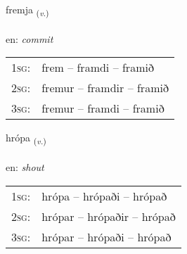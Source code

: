 \documentclass[frontgrid, backgrid]{flacards}\usepackage[]{graphicx}\usepackage[]{xcolor}
\begin{document}
\renewcommand{\flhead}{\vskip5pt \fboxsep=0pt {\small\bfseries\footnotesize Sagnorð | Verb}}
\renewcommand{\fcfoot}{\vskip5pt \fboxsep=0pt \hspace{2pt}{\small\bfseries\footnotesize 3K}}

\renewcommand{\blhead}{\vskip5pt {\small\bfseries\footnotesize Sagnorð | Verb }}
\renewcommand{\bcfoot}{\vskip5pt \hspace{2pt}{\small\bfseries\footnotesize 3K}}


{fremja \small{\textsubscript{(\textit{v.})}} \\[1ex] %
\textphonetic{[frɛmja]} \\
en: \emph{commit} \\  [2ex]
\renewcommand*{\arraystretch}{0.8}
\begin{tabular}{p{1cm}l}
\textsc{1sg}: & frem -- framdi -- framið \\ 
\textsc{2sg}: & fremur -- framdir -- framið \\ 
\textsc{3sg}: & fremur -- framdi -- framið \\ 
\end{tabular}
}

\renewcommand{\flhead}{\vskip5pt \fboxsep=0pt {\small\bfseries\footnotesize Sagnorð | Verb}}
\renewcommand{\fcfoot}{\vskip5pt \fboxsep=0pt \hspace{2pt}{\small\bfseries\footnotesize 3K}}

\renewcommand{\blhead}{\vskip5pt {\small\bfseries\footnotesize Sagnorð | Verb }}
\renewcommand{\bcfoot}{\vskip5pt \hspace{2pt}{\small\bfseries\footnotesize 3K}}


{hrópa \small{\textsubscript{(\textit{v.})}} \\[1ex] %
\textphonetic{[r̥ouːpa]} \\
en: \emph{shout} \\  [2ex]
\renewcommand*{\arraystretch}{0.8}
\begin{tabular}{p{1cm}l}
\textsc{1sg}: & hrópa -- hrópaði -- hrópað \\ 
\textsc{2sg}: & hrópar -- hrópaðir -- hrópað \\ 
\textsc{3sg}: & hrópar -- hrópaði -- hrópað \\ 
\end{tabular}
}
\end{document}
